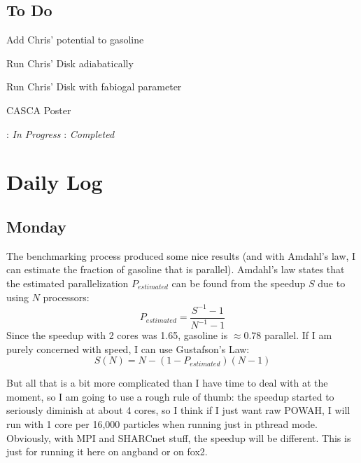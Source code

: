 \documentclass[11pt,letterpaper]{article}
\begin{document}
\pagebreak
\subsection*{To Do}
\begin{bullets}
\item[\checkmark] Add Chris' potential to gasoline
\item[\checkmark] Run Chris' Disk adiabatically
\item Run Chris' Disk with fabiogal parameter
\item CASCA Poster
\end{bullets}

\textleaf : \textit{In Progress} \qquad \checkmark : \textit{Completed}

\section*{Daily Log}
\subsection*{Monday}
The benchmarking process produced some nice results (and with Amdahl's law, I
can estimate the fraction of gasoline that is parallel).  Amdahl's law states
that the estimated parallelization $P_{estimated}$ can be found from the speedup
$S$ due to using $N$ processors:
$$P_{estimated} = \frac{S^{-1}-1}{N^{-1}-1}$$
Since the speedup with 2 cores was 1.65, gasoline is $\approx 0.78$ parallel. 
If I am purely concerned with speed, I can use Gustafson's Law:
$$S(N) = N -(1-P_{estimated})(N-1)$$

But all that is a bit more complicated than I have time to deal with at the moment, so I am going to use a rough rule of thumb:  the speedup started to 
seriously diminish at about 4 cores, so I think if I just want raw POWAH, I 
will run with 1 core per 16,000 particles when running just in pthread mode.
Obviously, with MPI and SHARCnet stuff, the speedup will be different.  This is
just for running it here on angband or on fox2.
\end{document}
